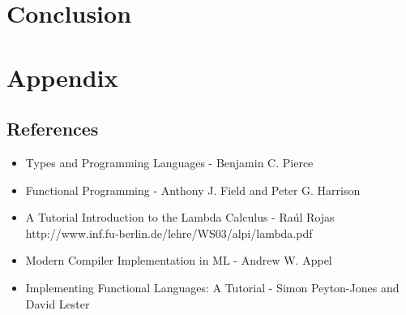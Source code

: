 \documentclass{article}
\begin{document}
\section{Conclusion}

\pagebreak
\section{Appendix}
\subsection{References}
\begin{itemize}
    \item Types and Programming Languages - Benjamin C. Pierce
    \item Functional Programming - Anthony J. Field and Peter G. Harrison
    \item A Tutorial Introduction to the Lambda Calculus - Ra\'{u}l Rojas \\
        http://www.inf.fu-berlin.de/lehre/WS03/alpi/lambda.pdf
    \item Modern Compiler Implementation in ML - Andrew W. Appel
    \item Implementing Functional Languages: A Tutorial - Simon Peyton-Jones and David Lester
\end{itemize}
\end{document}
